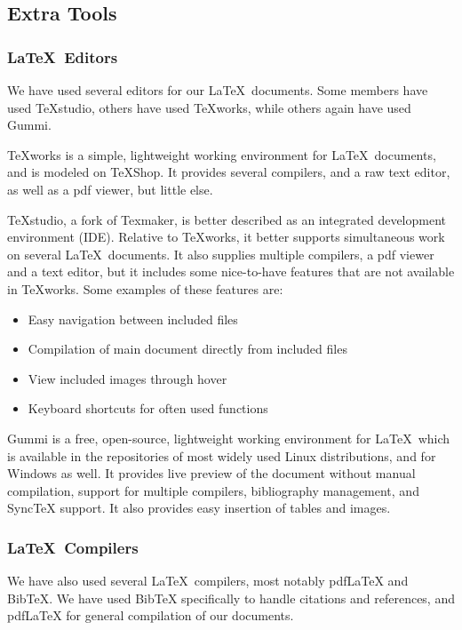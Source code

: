 \subsection{Extra Tools}
\subsubsection{\LaTeX \ Editors}%
We have used several editors for our \LaTeX \ documents. Some members have used TeXstudio, others have used TeXworks, while others again have used Gummi.

TeXworks is a simple, lightweight working environment for \LaTeX \ documents, and is modeled on TeXShop. It provides several compilers, and a raw text editor, as well as a pdf viewer, but little else.

TeXstudio, a fork of Texmaker, is better described as an integrated development environment (IDE). Relative to TeXworks, it better supports simultaneous work on several \LaTeX \ documents. It also supplies multiple compilers, a pdf viewer and a text editor, but it includes some nice-to-have features that are not available in TeXworks. Some examples of these features are:
\begin{itemize}
\item Easy navigation between included files
\item Compilation of main document directly from included files
\item View included images through hover
\item Keyboard shortcuts for often used functions
\end{itemize}

Gummi is a free, open-source, lightweight working environment for \LaTeX \ which is available in the repositories of most widely used Linux distributions, and for Windows as well. It provides live preview of the document without manual compilation, support for multiple compilers, bibliography management, and SyncTeX support. It also provides easy insertion of tables and images.

\subsubsection{\LaTeX \ Compilers}
We have also used several \LaTeX \ compilers, most notably pdfLaTeX and BibTeX. We have used BibTeX specifically to handle citations and references, and pdfLaTeX for general compilation of our documents.

